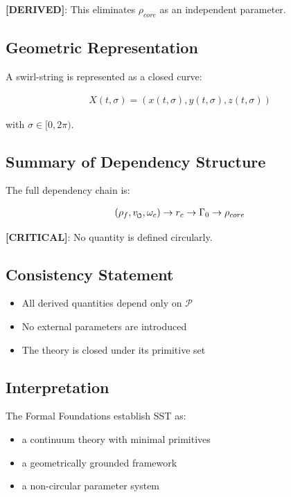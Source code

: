         \textbf{[DERIVED]}: This eliminates $\rho_{core}$ as an independent parameter.
    
    \subsection{Geometric Representation}
        
        A swirl-string is represented as a closed curve:
        
        \begin{align}
            X(t,\sigma) = (x(t,\sigma), y(t,\sigma), z(t,\sigma))
        \end{align}
        
        with $\sigma \in [0,2\pi)$.
    
    \subsection{Summary of Dependency Structure}
        
        The full dependency chain is:
        
        \begin{align}
        (\rho_f, v_{\swirlarrow}, \omega_c)
            \rightarrow r_c
            \rightarrow \Gamma_0
            \rightarrow \rho_{core}
        \end{align}
        
        \textbf{[CRITICAL]}:
        No quantity is defined circularly.
    
    \subsection{Consistency Statement}
        
        \begin{itemize}
            \item All derived quantities depend only on $\mathcal{P}$
            \item No external parameters are introduced
            \item The theory is closed under its primitive set
        \end{itemize}
    
    \subsection{Interpretation}
        
        The Formal Foundations establish SST as:
        
        \begin{itemize}
            \item a continuum theory with minimal primitives
            \item a geometrically grounded framework
            \item a non-circular parameter system
        \end{itemize}